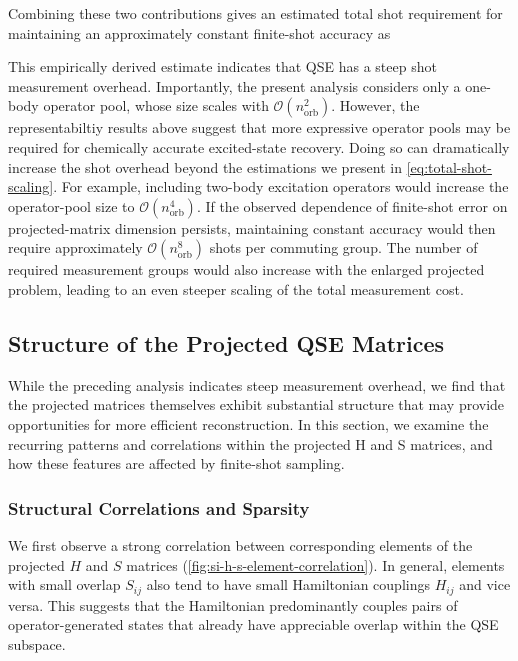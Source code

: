 Combining these two contributions gives an estimated total shot requirement for maintaining an approximately constant finite-shot accuracy as
\TotalShotScalingEquation

This empirically derived estimate indicates that QSE has a steep shot measurement overhead. Importantly, the present analysis considers only a one-body operator pool, whose size scales with $\mathcal{O}\!\left(n_{\mathrm{orb}}^{2}\right)$. 
However, the representabiltiy results above suggest that more expressive operator pools may be required for chemically accurate excited-state recovery.
Doing so can dramatically increase the shot overhead beyond the estimations we present in \cref{eq:total-shot-scaling}.
For example, including two-body excitation operators would increase the operator-pool size to $\mathcal{O}\!\left(n_{\mathrm{orb}}^{4}\right)$. 
If the observed dependence of finite-shot error on projected-matrix dimension persists, maintaining constant accuracy would then require approximately $\mathcal{O}\!\left(n_{\mathrm{orb}}^{8}\right)$ shots per commuting group. 
The number of required measurement groups would also increase with the enlarged projected problem, leading to an even steeper scaling of the total measurement cost.

\subsection{Structure of the Projected QSE Matrices}
While the preceding analysis indicates steep measurement overhead, we find that the projected matrices themselves exhibit substantial structure that may provide opportunities for more efficient reconstruction. 
In this section, we examine the recurring patterns and correlations within the projected H and S matrices, and how these features are affected by finite-shot sampling.

\subsubsection{Structural Correlations and Sparsity}
We first observe a strong correlation between corresponding elements of the projected $H$ and $S$ matrices (\cref{fig:si-h-s-element-correlation}). In general, elements with small overlap $S_{ij}$ also tend to have small Hamiltonian couplings $H_{ij}$ and vice versa. 
This suggests that the Hamiltonian predominantly couples pairs of operator-generated states that already have appreciable overlap within the QSE subspace.

